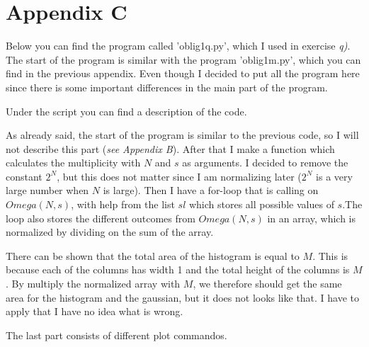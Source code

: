 \documentclass{scrartcl}
\begin{document}
\section{Appendix C}
Below you can find the program called 'oblig1q.py', which I used in exercise \textit{q)}. The start of the program is similar with the program 'oblig1m.py', which you can find in the previous appendix. Even though I decided to put all the program here since there is some important differences in the main part of the program. \par\vspace{3mm} Under the script you can find a description of the code.

As already said, the start of the program is similar to the previous code, so I will not describe this part (\textit{see Appendix B}). After that I make a function which calculates the multiplicity with $N$ and $s$ as arguments. I decided to remove the constant $2^N$, but this does not matter since I am normalizing later ($2^N$ is a very large number when $N$ is large). Then I have a for-loop that is calling on $Omega(N,s)$, with help from the list $sl$ which stores all possible values of $s$.The loop also stores the different outcomes from $Omega(N,s)$ in an array, which is normalized by dividing on the sum of the array.\par\vspace{3mm}
There can be shown that the total area of the histogram is equal to $M$. This is because each of the columns has width 1 and the total height of the columns is $M$. By multiply the normalized array with $M$, we therefore should get the same area for the histogram and the gaussian, but it does not looks like that. I have to apply that I have no idea what is wrong. \par\vspace{3mm}
The last part consists of different plot commandos.
\end{document}
